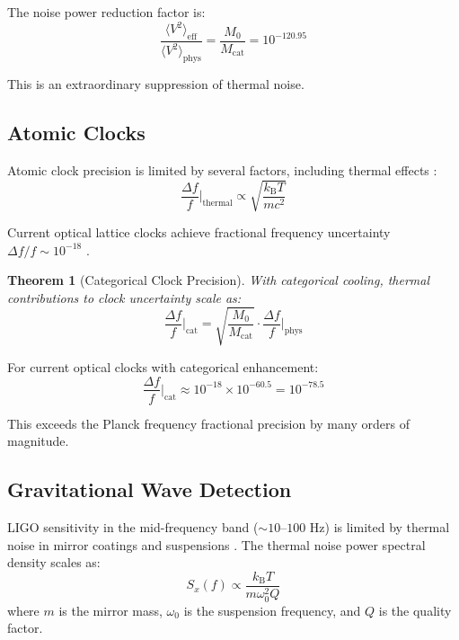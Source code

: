 \documentclass[twocolumn,10pt,twoside]{article}
\newtheorem{theorem}{Theorem}[section]
\newcommand{\kb}{k_{\mathrm{B}}}
\newcommand{\Mcat}{M_{\mathrm{cat}}}
\begin{document}
The noise power reduction factor is:
\begin{equation}
\frac{\langle V^2 \rangle_{\text{eff}}}{\langle V^2 \rangle_{\text{phys}}} = \frac{M_0}{\Mcat} = 10^{-120.95}
\end{equation}

This is an extraordinary suppression of thermal noise.

\subsection{Atomic Clocks}

Atomic clock precision is limited by several factors, including thermal effects \cite{ludlow2015}:
\begin{equation}
\frac{\Delta f}{f}\bigg|_{\text{thermal}} \propto \sqrt{\frac{\kb T}{mc^2}}
\end{equation}

Current optical lattice clocks achieve fractional frequency uncertainty $\Delta f/f \sim 10^{-18}$ \cite{mcgrew2018,brewer2019}.

\begin{theorem}[Categorical Clock Precision]
\label{thm:clock_precision}
With categorical cooling, thermal contributions to clock uncertainty scale as:
\begin{equation}
\frac{\Delta f}{f}\bigg|_{\text{cat}} = \sqrt{\frac{M_0}{\Mcat}} \cdot \frac{\Delta f}{f}\bigg|_{\text{phys}}
\end{equation}
\end{theorem}

For current optical clocks with categorical enhancement:
\begin{equation}
\frac{\Delta f}{f}\bigg|_{\text{cat}} \approx 10^{-18} \times 10^{-60.5} = 10^{-78.5}
\end{equation}

This exceeds the Planck frequency fractional precision by many orders of magnitude.

\subsection{Gravitational Wave Detection}

LIGO sensitivity in the mid-frequency band ($\sim 10$--$100$ Hz) is limited by thermal noise in mirror coatings and suspensions \cite{abbott2016,adhikari2014}. The thermal noise power spectral density scales as:
\begin{equation}
S_x(f) \propto \frac{\kb T}{m \omega_0^2 Q}
\end{equation}
where $m$ is the mirror mass, $\omega_0$ is the suspension frequency, and $Q$ is the quality factor.
\end{document}
